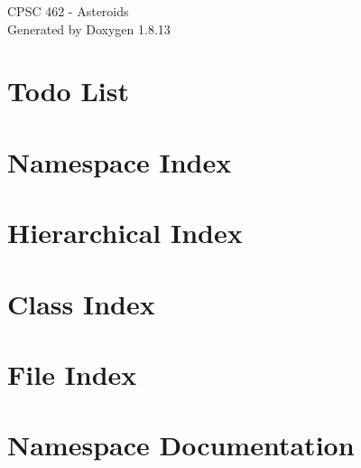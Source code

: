 \documentclass[twoside]{book}
\newcommand{\+}{\discretionary{\mbox{\scriptsize$\hookleftarrow$}}{}{}}
\newcommand{\clearemptydoublepage}{%
  \newpage{\pagestyle{empty}\cleardoublepage}%
}
\begin{document}
\hypersetup{pageanchor=false,
             bookmarksnumbered=true,
             pdfencoding=unicode
            }
\begin{titlepage}
\vspace*{7cm}
\begin{center}%
{\Large C\+P\+SC 462 -\/ Asteroids }\\
\vspace*{1cm}
{\large Generated by Doxygen 1.8.13}\\
\end{center}
\end{titlepage}
\clearemptydoublepage
{}
\tableofcontents
\clearemptydoublepage
{}
\hypersetup{pageanchor=true}

\chapter{Todo List}
\label{todo}

\chapter{Namespace Index}

\chapter{Hierarchical Index}

\chapter{Class Index}

\chapter{File Index}

\chapter{Namespace Documentation}






















\end{document}
